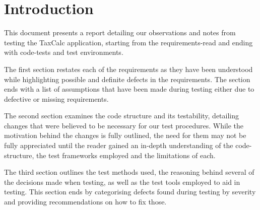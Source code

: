 \section*{Introduction}

This document presents a report detailing our observations and notes from testing the TaxCalc application, starting from the requirements-read and ending with code-tests and test environments.
\par
The first section restates each of the requirements as they have been understood while highlighting possible and definite defects in the requirements. The section ends with a list of assumptions that have been made during testing either due to defective or missing requirements. 
\par
The second section examines the code structure and its testability, detailing changes that were believed to be necessary for our test procedures. 
While the motivation behind the changes is fully outlined, the need for them may not be fully appreciated until the reader gained an in-depth understanding of the code-structure, the test frameworks employed and the limitations of each. 
\par
The third section outlines the test methods used, the reasoning behind several of the decisions made when testing, as well as the test tools employed to aid in testing. This section ends by categorising defects found during testing by severity and providing recommendations on how to fix those. 

